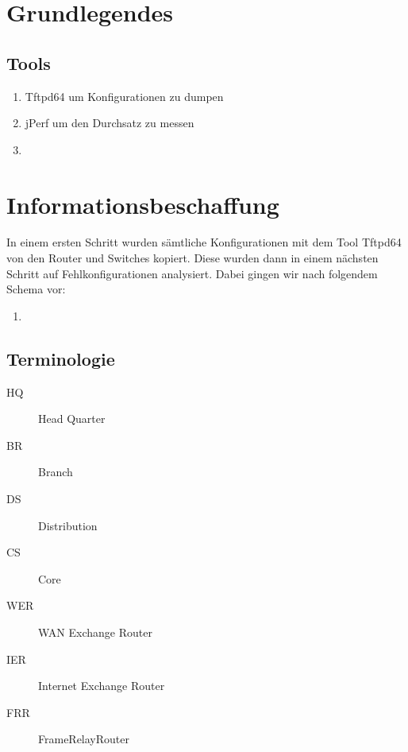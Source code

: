 

\newcommand{\SUBJECT}{Report}
\newcommand{\TITLE}{Cloud Infrastructre Lab 1}







\section{Grundlegendes}
\subsection{Tools}
\begin{enumerate}
	\item Tftpd64 um Konfigurationen zu dumpen
	\item jPerf um den Durchsatz zu messen
	\item %
\end{enumerate}

\section{Informationsbeschaffung}
In einem ersten Schritt wurden sämtliche Konfigurationen mit dem Tool Tftpd64 von den Router und Switches kopiert. Diese wurden dann in einem nächsten Schritt auf Fehlkonfigurationen analysiert. Dabei gingen wir nach folgendem Schema vor:

\begin{enumerate}
	\item 
\end{enumerate}

\subsection{Terminologie}
\begin{description}
	\item[HQ] Head Quarter
	\item[BR] Branch
	\item[DS] Distribution
	\item[CS] Core %
	\item[WER] WAN Exchange Router
	\item[IER] Internet Exchange Router
	\item[FRR] FrameRelayRouter
\end{description}

